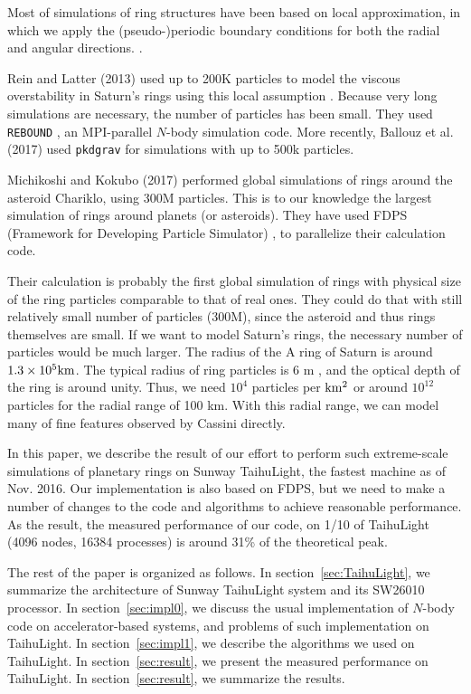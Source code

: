\documentclass[oribibl]{llncs}
\begin{document}
Most of simulations of ring structures have been based on local
approximation, in which we apply the (pseudo-)periodic boundary
conditions for both the radial and angular
directions. \cite{1988AJ.....95..925W}.

Rein and Latter (2013) used up to 200K particles to model the viscous
overstability in Saturn's rings using this local assumption
\cite{2013MNRAS.431..145R}. Because very long simulations are
necessary, the number of particles has been small. They used {\tt
  REBOUND} \cite{2012A&A...537A.128R}, an MPI-parallel $N$-body
simulation code. More recently, Ballouz et al. (2017)
\cite{2017AJ....153..146B} used {\tt pkdgrav}
\cite{2001PhDT........21S} for simulations with up to 500k particles.


Michikoshi and Kokubo (2017) \cite{2017ApJ...837L..13M} performed
global simulations of rings around the asteroid Chariklo, using 300M
particles. This is to our knowledge the largest simulation of rings
around planets (or asteroids).  They have used FDPS (Framework for
Developing Particle Simulator) \cite{2016PASJ...68...54I}, to
parallelize their calculation code.

Their calculation is probably the first global simulation of rings
with physical size of the ring particles comparable to that of real
ones. They could do that with still relatively small number of
particles (300M), since the asteroid and thus rings themselves are
small. If we want to model Saturn's rings, the necessary number of
particles would be much larger. The radius of the A ring of Saturn is
around $1.3\times 10^5\rm km$. The typical radius of ring particles is
6 m \cite{1985Icar...64..531Z}, and the optical depth of the ring is
around unity. Thus, we need $10^4$ particles per $\rm km^2$ or around
$10^{12}$ particles for the radial range of 100 km. With this radial
range, we can model many of fine features observed by Cassini
directly.

In this paper, we describe the result of our effort to perform such
extreme-scale simulations of planetary rings on Sunway TaihuLight, the
fastest machine as of Nov. 2016. Our implementation is also based on
FDPS, but we need to make a number of changes to the code and
algorithms to achieve reasonable performance. As the result, the
measured performance of our code, on 1/10 of TaihuLight (4096 nodes,
16384 processes) is around 31\% of the theoretical peak.

The rest of the paper is organized as follows. In
section~\ref{sec:TaihuLight}, we summarize the architecture of Sunway
TaihuLight system and its SW26010 processor. In
section~\ref{sec:impl0}, we discuss the usual implementation of
$N$-body code on accelerator-based systems, and problems of such
implementation on TaihuLight. In section~\ref{sec:impl1}, we describe
the algorithms we used on TaihuLight. In section~\ref{sec:result}, we
present the measured performance on TaihuLight. In
section~\ref{sec:result}, we summarize the results.
\end{document}
